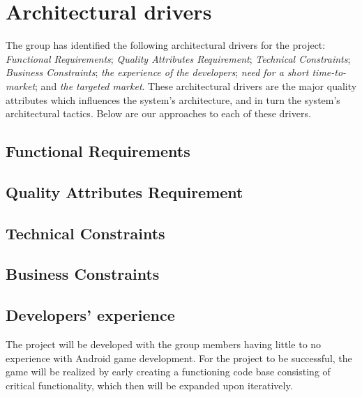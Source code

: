 \chapter{Architectural drivers}
The group has identified the following architectural drivers for the project: \emph{Functional Requirements}; \emph{Quality Attributes Requirement}; \emph{Technical Constraints}; \emph{Business Constraints}; \emph{the experience of the developers}; \emph{need for a short time-to-market}; and \emph{the targeted market}. These architectural drivers are the major quality attributes which influences the system's architecture, and in turn the system's architectural tactics\cite{pensum}. Below are our approaches to each of these drivers.



	\section{Functional Requirements}

	\section{Quality Attributes Requirement}

	\section{Technical Constraints}

	\section{Business Constraints}


	\section{Developers' experience}
	The project will be developed with the group members having little to no experience with Android game development. For the project to be successful, the game will be realized by early creating a functioning code base consisting of critical functionality, which then will be expanded upon iteratively.

